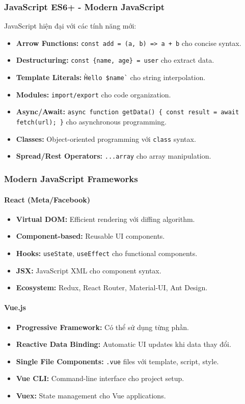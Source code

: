 \documentclass[a4paper,12pt]{report}
\begin{document}
\subsubsection{JavaScript ES6+ - Modern JavaScript}
JavaScript hiện đại với các tính năng mới:
\begin{itemize}
    \item \textbf{Arrow Functions:} \texttt{const add = (a, b) => a + b} cho concise syntax.
    \item \textbf{Destructuring:} \texttt{const \{name, age\} = user} cho extract data.
    \item \textbf{Template Literals:} \texttt{\`Hello \${name}\`} cho string interpolation.
    \item \textbf{Modules:} \texttt{import/export} cho code organization.
    \item \textbf{Async/Await:} \texttt{async function getData() \{ const result = await fetch(url); \}} cho asynchronous programming.
    \item \textbf{Classes:} Object-oriented programming với \texttt{class} syntax.
    \item \textbf{Spread/Rest Operators:} \texttt{...array} cho array manipulation.
\end{itemize}

\subsubsection{Modern JavaScript Frameworks}

\paragraph{React (Meta/Facebook)}
\begin{itemize}
    \item \textbf{Virtual DOM:} Efficient rendering với diffing algorithm.
    \item \textbf{Component-based:} Reusable UI components.
    \item \textbf{Hooks:} \texttt{useState}, \texttt{useEffect} cho functional components.
    \item \textbf{JSX:} JavaScript XML cho component syntax.
    \item \textbf{Ecosystem:} Redux, React Router, Material-UI, Ant Design.
\end{itemize}

\paragraph{Vue.js}
\begin{itemize}
    \item \textbf{Progressive Framework:} Có thể sử dụng từng phần.
    \item \textbf{Reactive Data Binding:} Automatic UI updates khi data thay đổi.
    \item \textbf{Single File Components:} \texttt{.vue} files với template, script, style.
    \item \textbf{Vue CLI:} Command-line interface cho project setup.
    \item \textbf{Vuex:} State management cho Vue applications.
\end{itemize}
\end{document}
